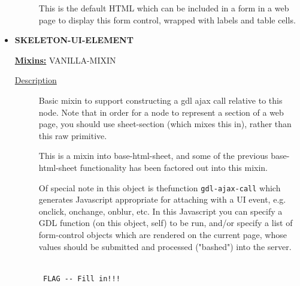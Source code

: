 \documentclass [11pt]{book}
\begin{document}
\begin{itemize}
\begin{description}
 This is the default HTML which can be included in a form in a web page to display this form control, wrapped with labels and table cells.




\end{description}







\item {}
\label{prim:skeleton-ui-element}
\textbf{SKELETON-UI-ELEMENT}


\textbf{
\underline{Mixins:}} VANILLA-MIXIN





\begin{description}

\item [
\underline{Description}]


Basic mixin to support constructing a gdl ajax call 
relative to this node. Note that in order for a node to represent a section of a 
web page, you should use sheet-section (which mixes this in), rather than this raw 
primitive. 

This is a mixin into base-html-sheet, and some of the previous base-html-sheet 
functionality has been factored out into this mixin. 

Of special note in this object is thefunction \texttt{gdl-ajax-call} which generates 
Javascript appropriate for attaching with a UI event, e.g. onclick, onchange, 
onblur, etc. In this Javascript you can specify a GDL function (on this object, self) 
to be run, and/or specify a list of form-control objects which are rendered on 
the current page, whose values should be submitted and processed ("bashed") into the 
server.



\end{description}




\begin{figure}
\begin{lrbox}{\boxedverb}
\begin{minipage}{\linewidth}
{\small

\begin{verbatim}

 FLAG -- Fill in!!!


\end{verbatim}}
\end{minipage}
\end{lrbox}
\fbox{\usebox{\boxedverb}}


\end{figure}
\end{itemize}
\end{document}
